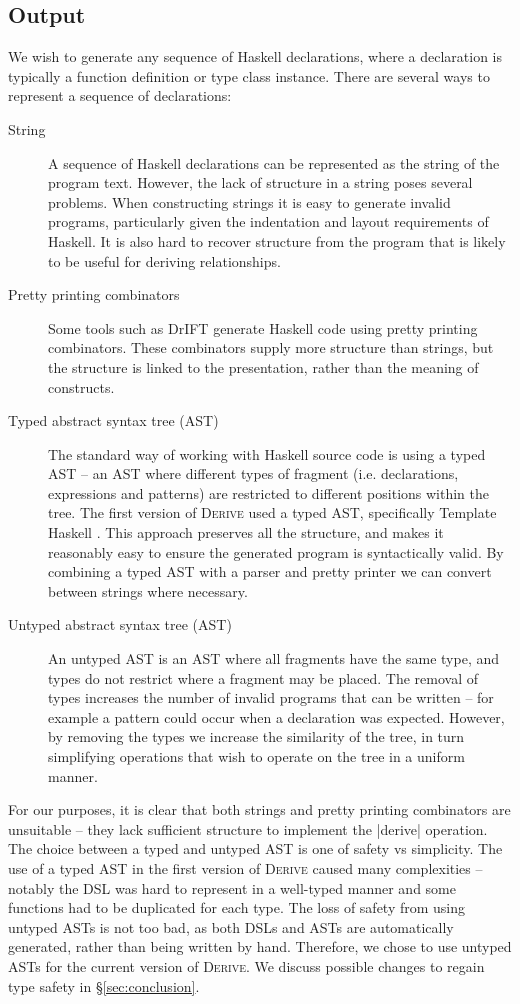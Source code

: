 \documentclass[preprint,draft]{sigplanconf}
\newcommand{\derive}{\textsc{Derive}}
\begin{document}
\subsection{Output}
\label{sec:output}

We wish to generate any sequence of Haskell declarations, where a declaration is typically a function definition or type class instance. There are several ways to represent a sequence of declarations:

\begin{description}
\item[String] A sequence of Haskell declarations can be represented as the string of the program text. However, the lack of structure in a string poses several problems. When constructing strings it is easy to generate invalid programs, particularly given the indentation and layout requirements of Haskell. It is also hard to recover structure from the program that is likely to be useful for deriving relationships.
\item[Pretty printing combinators] Some tools such as DrIFT \cite{drift} generate Haskell code using pretty printing combinators. These combinators supply more structure than strings, but the structure is linked to the presentation, rather than the meaning of constructs.
\item[Typed abstract syntax tree (AST)] The standard way of working with Haskell source code is using a typed AST -- an AST where different types of fragment (i.e. declarations, expressions and patterns) are restricted to different positions within the tree. The first version of \derive{} used a typed AST, specifically Template Haskell \cite{template_haskell}. This approach preserves all the structure, and makes it reasonably easy to ensure the generated program is syntactically valid. By combining a typed AST with a parser and pretty printer we can convert between strings where necessary.
\item[Untyped abstract syntax tree (AST)] An untyped AST is an AST where all fragments have the same type, and types do not restrict where a fragment may be placed. The removal of types increases the number of invalid programs that can be written -- for example a pattern could occur when a declaration was expected. However, by removing the types we increase the similarity of the tree, in turn simplifying operations that wish to operate on the tree in a uniform manner.
\end{description}

For our purposes, it is clear that both strings and pretty printing combinators are unsuitable -- they lack sufficient structure to implement the |derive| operation. The choice between a typed and untyped AST is one of safety vs simplicity. The use of a typed AST in the first version of \derive{} caused many complexities -- notably the DSL was hard to represent in a well-typed manner and some functions had to be duplicated for each type. The loss of safety from using untyped ASTs is not too bad, as both DSLs and ASTs are automatically generated, rather than being written by hand. Therefore, we chose to use untyped ASTs for the current version of \derive{}. We discuss possible changes to regain type safety in \S\ref{sec:conclusion}.
\end{document}
